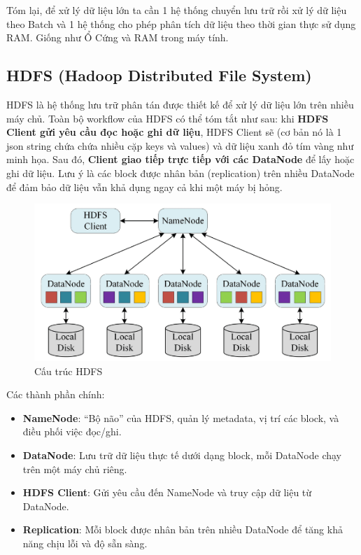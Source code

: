 \documentclass[11pt]{article}
\begin{document}
Tóm lại, để xử lý dữ liệu lớn ta cần 1 hệ thống chuyển lưu trữ rồi xử lý dữ liệu theo Batch và 1 hệ thống cho phép phân tích dữ liệu theo thời gian thực sử dụng RAM. Giống như Ổ Cứng và RAM trong máy tính.


\subsection{HDFS (Hadoop Distributed File System)}
HDFS là hệ thống lưu trữ phân tán được thiết kế để xử lý dữ liệu lớn trên nhiều máy chủ.
Toàn bộ workflow của HDFS có thể tóm tắt như sau: khi \textbf{HDFS Client gửi yêu cầu đọc hoặc ghi dữ liệu},
HDFS Client sẽ  (cơ bản nó là 1 json string chứa chứa nhiều cặp keys và values)
và  dữ liệu xanh đỏ tím vàng như minh họa. Sau đó, \textbf{Client giao tiếp trực tiếp với các DataNode}
để lấy hoặc ghi dữ liệu. Lưu ý là các block được nhân bản (replication) trên nhiều DataNode để đảm bảo dữ liệu vẫn khả dụng ngay cả khi một máy bị hỏng.

\begin{figure}[H]
    \centering
    \includegraphics[width=0.7\linewidth]{images/hdfs.png}
    \caption{Cấu trúc HDFS}
    \label{fig:hdfs-structure}
\end{figure}

\noindent Các thành phần chính:
\begin{itemize}
    \item \textbf{NameNode}: ``Bộ não'' của HDFS, quản lý metadata, vị trí các block, và điều phối việc đọc/ghi.
    \item \textbf{DataNode}: Lưu trữ dữ liệu thực tế dưới dạng block, mỗi DataNode chạy trên một máy chủ riêng.
    \item \textbf{HDFS Client}: Gửi yêu cầu đến NameNode và truy cập dữ liệu từ DataNode.
    \item \textbf{Replication}: Mỗi block được nhân bản trên nhiều DataNode để tăng khả năng chịu lỗi và độ sẵn sàng.
\end{itemize}
\end{document}
